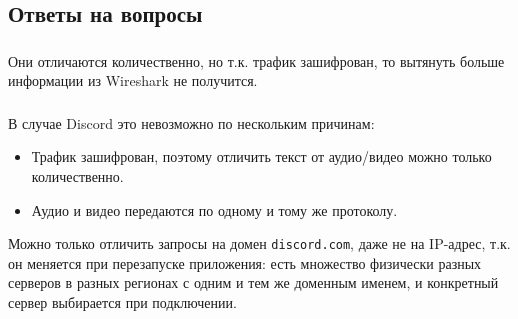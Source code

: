 \subsection{Ответы на вопросы}

\subsubsection{}
Они отличаются количественно, но т.к. трафик зашифрован, то вытянуть больше информации из Wireshark не получится.

\subsubsection{}
В случае Discord это невозможно по нескольким причинам:
\begin{itemize}
    \item Трафик зашифрован, поэтому отличить текст от аудио/видео можно только количественно.
    \item Аудио и видео передаются по одному и тому же протоколу.
\end{itemize}

Можно только отличить запросы на домен \texttt{discord.com},
даже не на IP-адрес, т.к. он меняется при перезапуске приложения:
есть множество физически разных серверов в разных регионах с одним и тем же доменным именем,
и конкретный сервер выбирается при подключении.
